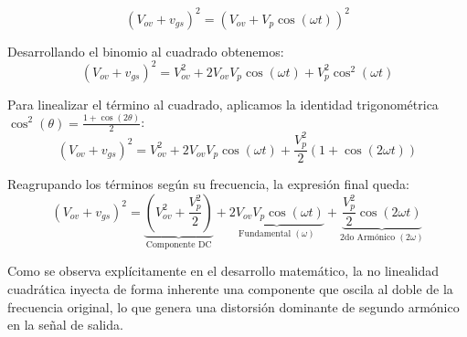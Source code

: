 \begin{enumerate}
\begin{equation*}
(V_{ov} + v_{gs})^2 = (V_{ov} + V_p \cos(\omega t))^2
\end{equation*}

Desarrollando el binomio al cuadrado obtenemos:
\begin{equation*}
(V_{ov} + v_{gs})^2 = V_{ov}^2 + 2 V_{ov} V_p \cos(\omega t) + V_p^2 \cos^2(\omega t)
\end{equation*}

Para linealizar el término al cuadrado, aplicamos la identidad trigonométrica $\cos^2(\theta) = \frac{1 + \cos(2\theta)}{2}$:
\begin{equation*}
(V_{ov} + v_{gs})^2 = V_{ov}^2 + 2 V_{ov} V_p \cos(\omega t) + \frac{V_p^2}{2} \left( 1 + \cos(2\omega t) \right)
\end{equation*}

Reagrupando los términos según su frecuencia, la expresión final queda:
\begin{equation*}
(V_{ov} + v_{gs})^2 = \underbrace{\left( V_{ov}^2 + \frac{V_p^2}{2} \right)}_{\text{Componente DC}} + \underbrace{2 V_{ov} V_p \cos(\omega t)}_{\text{Fundamental } (\omega)} + \underbrace{\frac{V_p^2}{2} \cos(2\omega t)}_{\text{2do Armónico } (2\omega)}
\end{equation*}

Como se observa explícitamente en el desarrollo matemático, la no linealidad cuadrática inyecta de forma inherente una componente que oscila al doble de la frecuencia original, lo que genera una distorsión dominante de segundo armónico en la señal de salida.

\end{enumerate}


